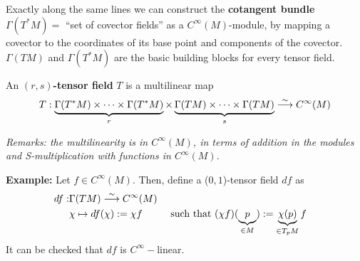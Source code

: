 Exactly along the same lines we can construct the \textbf{cotangent bundle} $\Gamma(T^*M) = $ ``set of covector fields'' as a $C^{\infty}(M)$-module, by mapping a covector to the coordinates of its base point and components of the covector. $\Gamma(TM)$ and $\Gamma(T^*M)$ are the basic building blocks for every tensor field.

\begin{definition}
An \textbf{$(r,s)$-tensor field} $T$ is a multilinear map
\begin{equation}
T:\underbrace{\Gamma(T^*M) \times \dotsb \times \Gamma(T^*M)}_{r} \times \underbrace{\Gamma(TM) \times \dotsb \times \Gamma(TM)}_{s} \stackrel{\sim}{\longrightarrow} C^{\infty}(M)
\end{equation}
\end{definition}

\textit{Remarks: the multilinearity is in $C^{\infty}(M)$, in terms of addition in the modules and S-multiplication with functions in $C^{\infty}(M)$.}

\textbf{Example:} Let $f\in C^{\infty}(M)$. Then, define a ($0,1$)-tensor field $df$ as
\[
\begin{gathered}
  \begin{aligned} 
    df : & \Gamma(TM) \stackrel{\sim}{\longrightarrow} C^{\infty}(M) \\ 
    & \chi \mapsto df(\chi) := \chi f && \text{ such that } (\chi f)(\underbrace{p}_{ \in M}) := \underbrace{\chi(p)}_{\in T_pM}f
\end{aligned}
\end{gathered}
\]
It can be checked that $df$ is $C^{\infty}-$linear.
